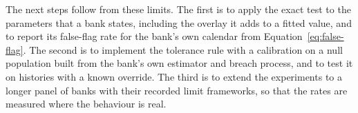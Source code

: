 The next steps follow from these limits. The first is to apply the exact test to the parameters that a bank states, including the overlay it adds to a fitted value, and to report its false-flag rate for the bank's own calendar from Equation~\eqref{eq:false-flag}. The second is to implement the tolerance rule with a calibration on a null population built from the bank's own estimator and breach process, and to test it on histories with a known override. The third is to extend the experiments to a longer panel of banks with their recorded limit frameworks, so that the rates are measured where the behaviour is real.
